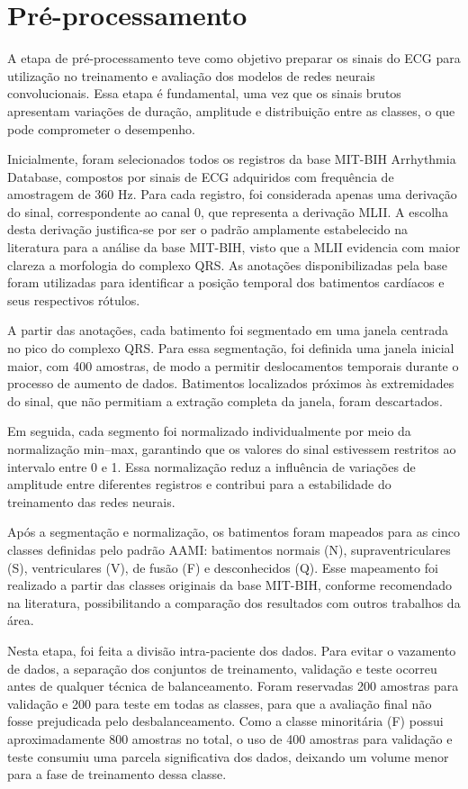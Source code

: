 \section{Pré-processamento}

A etapa de pré-processamento teve como objetivo preparar os sinais do ECG para utilização no treinamento e avaliação dos 
modelos de redes neurais convolucionais. Essa etapa é fundamental, uma vez que os sinais brutos apresentam variações de duração, amplitude e 
distribuição entre as classes, o que pode comprometer o desempenho.

Inicialmente, foram selecionados todos os registros da base MIT-BIH Arrhythmia Database, compostos por sinais de ECG adquiridos com frequência de 
amostragem de 360 Hz. Para cada registro, foi considerada apenas uma derivação do sinal, correspondente ao canal 0, que representa a derivação MLII. 
A escolha desta derivação justifica-se por ser o padrão amplamente estabelecido na literatura para a análise da base MIT-BIH, visto que a MLII 
evidencia com maior clareza a morfologia do complexo QRS. As anotações disponibilizadas pela base foram utilizadas para identificar a posição 
temporal dos batimentos cardíacos e seus respectivos rótulos.

A partir das anotações, cada batimento foi segmentado em uma janela centrada no pico do complexo QRS. Para essa segmentação, foi definida uma 
janela inicial maior, com 400 amostras, de modo a permitir deslocamentos temporais durante o processo de aumento de dados. Batimentos localizados 
próximos às extremidades do sinal, que não permitiam a extração completa da janela, foram descartados.

Em seguida, cada segmento foi normalizado individualmente por meio da normalização min–max, garantindo que os valores do sinal estivessem 
restritos ao intervalo entre 0 e 1. Essa normalização reduz a influência de variações de amplitude entre diferentes registros e 
contribui para a estabilidade do treinamento das redes neurais.

Após a segmentação e normalização, os batimentos foram mapeados para as cinco classes definidas pelo padrão AAMI: batimentos normais (N), 
supraventriculares (S), ventriculares (V), de fusão (F) e desconhecidos (Q). Esse mapeamento foi realizado a partir das classes originais da 
base MIT-BIH, conforme recomendado na literatura, possibilitando a comparação dos resultados com outros trabalhos da área.

Nesta etapa, foi feita a divisão intra-paciente dos dados. Para evitar o vazamento de dados, a separação dos conjuntos de treinamento, validação e 
teste ocorreu antes de qualquer técnica de balanceamento. Foram reservadas 200 amostras para validação e 200 para teste em todas as classes, para 
que a avaliação final não fosse prejudicada pelo desbalanceamento. Como a classe minoritária (F) possui aproximadamente 800 amostras no total, o 
uso de 400 amostras para validação e teste consumiu uma parcela significativa dos dados, deixando um volume menor para a fase de treinamento 
dessa classe.

